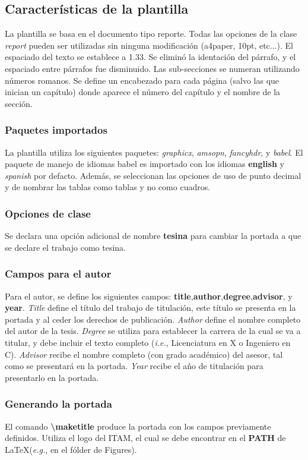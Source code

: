 \subsection{Características de la plantilla}
La plantilla se basa en el documento tipo reporte. Todas las opciones de la clase \emph{report} pueden ser utilizadas sin ninguna modificación (a4paper, 10pt, etc...). El espaciado del texto se establece a 1.33. Se eliminó la identación del párrafo, y el espaciado entre párrafos fue disminuido. Las sub-secciones se numeran utilizando números romanos. Se define un encabezado para cada página (salvo las que inician un capítulo) donde aparece el número del capítulo y el nombre de la sección.

\subsubsection{Paquetes importados}
La plantilla utiliza los siguientes paquetes: \emph{graphicx}, \emph{amsopn}, \emph{fancyhdr}, y \emph{babel}. El paquete de manejo de idiomas babel es importado con los idiomas \textbf{english} y \emph{spanish} por defacto. Además, se seleccionan las opciones de uso de punto decimal y de nombrar las tablas como tablas y no como cuadros. 

\subsubsection{Opciones de clase}
Se declara una opción adicional de nombre \textbf{tesina} para cambiar la portada a que se declare el trabajo como tesina. 

\subsubsection{Campos para el autor}
Para el autor, se define los siguientes campos: \textbf{title},\textbf{author},\textbf{degree},\textbf{advisor}, y \textbf{year}. \emph{Title} define el título del trabajo de titulación, este título se presenta en la portada y al ceder los derechos de publicación. \emph{Author} define el nombre completo del autor de la tesis. \emph{Degree} se utiliza para establecer la carrera de la cual se va a titular, y debe incluir el texto completo (\emph{i.e.}, Licenciatura en X o Ingeniero en C). \emph{Advisor} recibe el nombre completo (con grado académico) del asesor, tal como se presentará en la portada. \emph{Year} recibe el año de titulación para presentarlo en la portada.

\subsubsection{Generando la portada}
El comando \textbf{\textbackslash maketitle} produce la portada con los campos previamente definidos. Utiliza el logo del ITAM, el cual se debe encontrar en el \textbf{PATH} de \LaTeX (\emph{e.g.}, en el fólder de Figures). 

